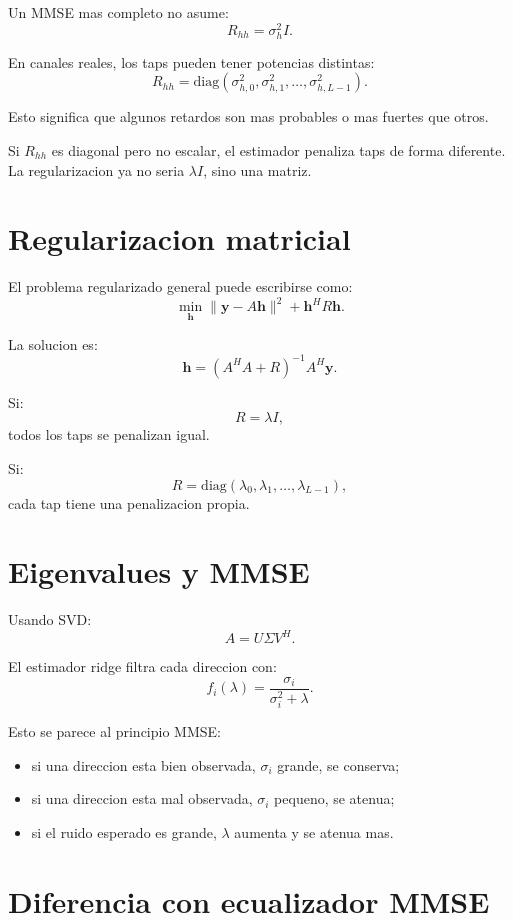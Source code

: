 \documentclass[11pt]{article}
\begin{document}
Un MMSE mas completo no asume:
\[
    R_{hh} = \sigma_h^2 I.
\]

En canales reales, los taps pueden tener potencias distintas:
\[
    R_{hh}
    =
    \mathrm{diag}
    (\sigma_{h,0}^2,\sigma_{h,1}^2,\ldots,\sigma_{h,L-1}^2).
\]

Esto significa que algunos retardos son mas probables o mas fuertes que otros.

Si \(R_{hh}\) es diagonal pero no escalar, el estimador penaliza taps de forma
diferente. La regularizacion ya no seria \(\lambda I\), sino una matriz.

\section{Regularizacion matricial}

El problema regularizado general puede escribirse como:
\[
    \min_{\bm h}
    \|\bm y-A\bm h\|^2
    +
    \bm h^H R \bm h.
\]

La solucion es:
\[
    \hat{\bm h}
    =
    (A^H A+R)^{-1}A^H\bm y.
\]

Si:
\[
    R=\lambda I,
\]
todos los taps se penalizan igual.

Si:
\[
    R=\mathrm{diag}(\lambda_0,\lambda_1,\ldots,\lambda_{L-1}),
\]
cada tap tiene una penalizacion propia.

\section{Eigenvalues y MMSE}

Usando SVD:
\[
    A=U\Sigma V^H.
\]

El estimador ridge filtra cada direccion con:
\[
    f_i(\lambda)
    =
    \frac{\sigma_i}{\sigma_i^2+\lambda}.
\]

Esto se parece al principio MMSE:

\begin{itemize}
    \item si una direccion esta bien observada, \(\sigma_i\) grande, se conserva;
    \item si una direccion esta mal observada, \(\sigma_i\) pequeno, se atenua;
    \item si el ruido esperado es grande, \(\lambda\) aumenta y se atenua mas.
\end{itemize}

\section{Diferencia con ecualizador MMSE}
\end{document}
